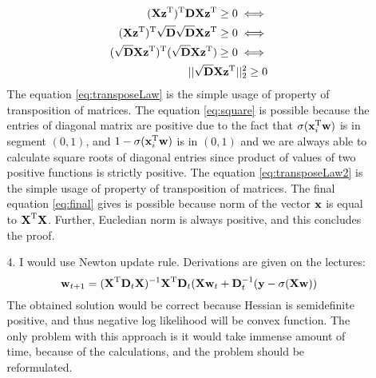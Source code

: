 \documentclass[10pt,a4paper]{article}
\begin{document}
\begin{enumerate}
\begin{enumerate}
\begin{align}
(\textbf{\text{{X}}}\textbf{\text{{z}}} ^ \text{T}) ^ \text{T}\textbf{\text{{D}}}\textbf{\text{{X}}}\textbf{\text{{z}}} ^ \text{T} \geq 0 \iff \label{eq:transposeLaw}\\
(\textbf{\text{{X}}}\textbf{\text{{z}}} ^ \text{T}) ^ \text{T}\sqrt{\textbf{\text{{D}}}}\sqrt{\textbf{\text{{D}}}}\textbf{\text{{X}}}\textbf{\text{{z}}} ^ \text{T} \geq 0 \label{eq:square}\iff\\
(\sqrt{\textbf{\text{{D}}}}\textbf{\text{{X}}}\textbf{\text{{z}}} ^ \text{T}) ^ \text{T}(\sqrt{\textbf{\text{{D}}}}\textbf{\text{{X}}}\textbf{\text{{z}}} ^ \text{T}) \geq 0 \iff \label{eq:transposeLaw2} \\
||\sqrt{\textbf{\text{{D}}}}\textbf{\text{{X}}}\textbf{\text{{z}}} ^ \text{T}||_2^2 \geq 0 \label{eq:final}
\end{align}
The equation \ref{eq:transposeLaw} is the simple usage of property of transposition of matrices. The equation \ref{eq:square} is possible because the entries of diagonal matrix are positive due to the fact that $\sigma(\textbf{\text{{x}}} ^ \text{T}_i \textbf{\text{{w}}})$ is in segment $(0, 1)$, and $1-\sigma(\textbf{\text{{x}}} ^ \text{T}_i \textbf{\text{{w}}})$ is in $(0, 1)$ and we are always able to calculate square roots of diagonal entries since product of values of two positive functions is strictly positive. The equation \ref{eq:transposeLaw2} is the simple usage of property of transposition of matrices. The final equation \ref{eq:final} gives is possible because norm of the vector $\textbf{\text{{x}}}$ is equal to $\textbf{\text{{X}}} ^ \text{T}\textbf{\text{{X}}}$. Further, Eucledian norm is always positive, and this concludes the proof.
\item[4.] 
I would use Newton update rule. Derivations are given on the lectures:
$$\textbf{\text{{w}}}_{t+1}=(\textbf{\text{{X}}} ^ \text{T}\textbf{\text{{D}}}_t\textbf{\text{{X}}})^{-1}\textbf{\text{{X}}} ^ \text{T}\textbf{\text{{D}}}_t(\textbf{\text{{X}}}\textbf{\text{{w}}}_t + \textbf{\text{{D}}}_t^{-1}(\textbf{\text{{y}}}-\sigma(\textbf{\text{{X}}} \textbf{\text{{w}}}))$$ 
The obtained solution would be correct because Hessian is semidefinite positive, and thus negative log likelihood will be convex function. The only problem with this approach is it would take immense amount of time, because of the calculations, and the problem should be reformulated.
\end{enumerate}


\end{enumerate}
\end{document}
